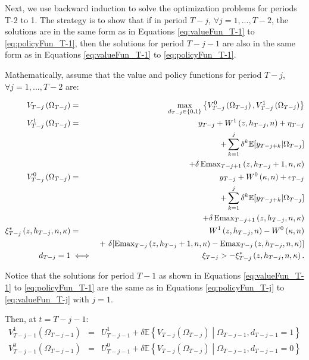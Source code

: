 \indent Next, we use backward induction to solve the optimization problems for periods T-2 to 1. The strategy is to show that if in period $T-j$, $\forall j=1,...,T-2$, the solutions are in the same form as in Equations \eqref{eq:valueFun_T-1} to \eqref{eq:policyFun_T-1}, then the solutions for period $T-j -1$ are also in the same form as in Equations \eqref{eq:valueFun_T-1} to \eqref{eq:policyFun_T-1}.

\indent Mathematically, assume that the value and policy functions for period $T-j$, $\forall j=1,...,T-2$ are:

\begin{eqnarray}
V_{T-j}\left(\Omega_{T-j}\right) &=& \max_{d_{T-j} \in \{0, 1\}} \left\{V^{0}_{T-j} \left(\Omega_{T-j} \right),V^{1}_{T-j} \left(\Omega_{T-j} \right)\right\}  \label{eq:valueFun_T-j} \\ 
V^{1}_{T-j} \left(\Omega_{T-j} \right) &=& y_{T-j} + W^{1} \left(z,h_{T-j},n\right) + \eta_{T-j} \nonumber \\
& & + \sum_{k=1}^{j} \delta^{k} \mathbb{E} [y_{T-j+k} | \Omega_{T-j}] \nonumber \\
& & + \delta \operatorname{Emax}_{T-j+1} \left(z,h_{T-j}+1,n,\kappa \right) \\
V^{0}_{T-j} \left(\Omega_{T-j} \right) &=& y_{T-j} + W^0 \left( \kappa, n \right) + \epsilon_{T-j} \nonumber \\
& & + \sum_{k=1}^{j} \delta^{k} \mathbb{E} [y_{T-j+k} | \Omega_{T-j}] \nonumber \\
& & + \delta \operatorname{Emax}_{T-j+1} \left(z,h_{T-j},n,\kappa \right) \\
\xi^*_{T-j}\left(z, h_{T-j}, n, \kappa \right) &=& W^1\left(z, h_{T-j}, n\right) - W^0\left(\kappa, n\right) \nonumber \\
& &+\ \delta [ \operatorname{Emax}_{T-j}\left(z, h_{T-j}+1, n, \kappa\right) - \operatorname{Emax}_{T-j}\left(z, h_{T-j}, n, \kappa \right)] \\
d_{T-j} = 1 & \iff &  \xi_{T-j} > -\xi^*_{T-j}\left(z, h_{T-j}, n, \kappa\right) \label{eq:policyFun_T-j}.
\end{eqnarray}

\indent Notice that the solutions for period $T-1$ as shown in Equations \eqref{eq:valueFun_T-1} to \eqref{eq:policyFun_T-1} are the same as in Equations \eqref{eq:policyFun_T-j} to \eqref{eq:valueFun_T-j} with $j = 1$.

\indent Then, at $t = T - j -1$:
\begin{eqnarray*}
V^{1}_{T-j-1}\left(\Omega_{T-j-1}\right) &=& U^{1}_{T-j-1} + 
\delta \mathbb{E} \left\{ V_{T-j}\left(\Omega_{T-j}\right) \middle| \Omega_{T-j-1}, d_{T-j-1}=1\right\} \\
V^{0}_{T-j-1}\left(\Omega_{T-j-1}\right) &=& U^{0}_{T-j-1} + 
\delta \mathbb{E} \left\{ V_{T-j}\left(\Omega_{T-j}\right) \middle| \Omega_{T-j-1}, d_{T-j-1}=0\right\}
\end{eqnarray*}

